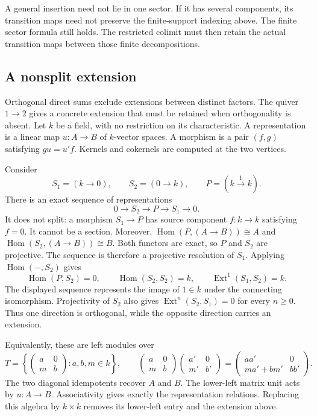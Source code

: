 A general insertion need not lie in one sector. If it has several
components, its transition maps need not preserve the finite-support
indexing above. The finite sector formula still holds. The restricted
colimit must then retain the actual transition maps between those
finite decompositions.

\subsection{A nonsplit extension}

Orthogonal direct sums exclude extensions between distinct factors.
The quiver $1\to2$ gives a concrete extension that must be retained when
orthogonality is absent. Let $k$ be a field, with no restriction on its
characteristic. A representation is a linear map $u:A\to B$ of
$k$-vector spaces. A morphism is a pair $(f,g)$ satisfying $gu=u'f$.
Kernels and cokernels are computed at the two vertices.

Consider
\[
 S_1=(k\to0),\qquad S_2=(0\to k),\qquad P=(k\xrightarrow{1}k).
\]
There is an exact sequence of representations
\[
 0\longrightarrow S_2\longrightarrow P\longrightarrow S_1
   \longrightarrow0.
\]
It does not split: a morphism $S_1\to P$ has source component
$f:k\to k$ satisfying $f=0$. It cannot be a section.
Moreover, $\operatorname{Hom}(P,(A\to B))\cong A$ and
$\operatorname{Hom}(S_2,(A\to B))\cong B$.
Both functors are exact, so $P$ and $S_2$ are projective.
The sequence is therefore a projective resolution of $S_1$.
Applying $\operatorname{Hom}(-,S_2)$ gives
\[
 \operatorname{Hom}(P,S_2)=0,\qquad
 \operatorname{Hom}(S_2,S_2)=k,\qquad
 \operatorname{Ext}^1(S_1,S_2)=k.
\]
The displayed sequence represents the image of $1\in k$ under the
connecting isomorphism. Projectivity of $S_2$ also gives
$\operatorname{Ext}^n(S_2,S_1)=0$ for every $n\ge0$.
Thus one direction is orthogonal, while the opposite direction carries
an extension.

Equivalently, these are left modules over
\[
 T=\left\{\begin{pmatrix}a&0\\m&b\end{pmatrix}:a,b,m\in k\right\},
 \qquad
 \begin{pmatrix}a&0\\m&b\end{pmatrix}
 \begin{pmatrix}a'&0\\m'&b'\end{pmatrix}
 =\begin{pmatrix}aa'&0\\ma'+bm'&bb'\end{pmatrix}.
\]
The two diagonal idempotents recover $A$ and $B$. The lower-left matrix
unit acts by $u:A\to B$. Associativity gives exactly the representation
relations. Replacing this algebra by $k\times k$ removes its lower-left
entry and the extension above.

